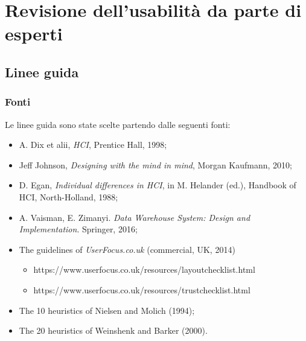 \section{Revisione dell'usabilità da parte di esperti}
\label{s:revisione-usabilita-esperti}

\subsection{Linee guida}
\label{ss:linee-guida}

\subsubsection{Fonti}
\label{sss:fonti}
Le linee guida sono state scelte partendo dalle seguenti fonti:
\begin{itemize}
    \item A. Dix et alii, \textit{HCI}, Prentice Hall, 1998;
    \item Jeff Johnson, \textit{Designing with the mind in mind}, Morgan Kaufmann, 2010;
    \item D. Egan, \textit{Individual differences in HCI}, in M. Helander (ed.), Handbook of HCI, North-Holland, 1988;
    \item A. Vaisman, E. Zimanyi. \textit{Data Warehouse System: Design and Implementation}. Springer, 2016;
    \item The guidelines of \textit{UserFocus.co.uk} (commercial, UK, 2014)
    \begin{itemize}
        \item https://www.userfocus.co.uk/resources/layoutchecklist.html
        \item https://www.userfocus.co.uk/resources/trustchecklist.html
    \end{itemize}
    \item The 10 heuristics of Nielsen and Molich (1994);
    \item The 20 heuristics of Weinshenk and Barker (2000).
\end{itemize}

